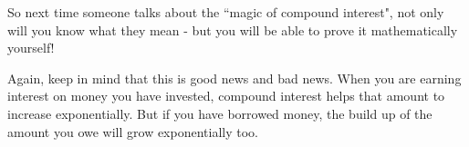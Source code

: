         \label{m39334*id73760}So next time someone talks about the ``magic of compound interest", not only will you know what they mean - but you will be able to prove it mathematically yourself!\par 
        \label{m39334*id73766}Again, keep in mind that this is good news and bad news. When you are earning interest on money you have invested, compound interest helps that amount to increase exponentially. But if you have borrowed money, the build up of the amount you owe will grow exponentially too.\par 
%       
%         
